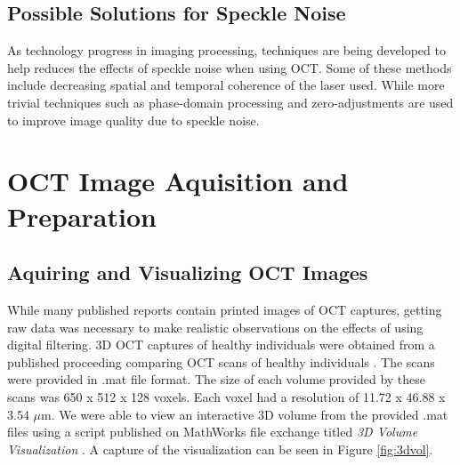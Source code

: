 \documentclass[%
reprint,
showpacs,preprintnumbers,
bibnotes,
amsmath,amssymb,
aps,
pra,
]{revtex4-1}
\begin{document}
	\subsection{\label{sec:level2} Possible Solutions for Speckle Noise}
		As technology progress in imaging processing, techniques are being developed to help reduces the effects of speckle noise when using OCT. Some of these methods include decreasing spatial and temporal coherence of the laser used. While more trivial techniques such as phase-domain processing and zero-adjustments are used to improve image quality due to speckle noise. \cite{Popescu2007}

	\section{\label{sec:level1} OCT Image Aquisition and Preparation}

	\subsection{\label{sec:level2} Aquiring and Visualizing OCT Images}
		While many published reports contain printed images of OCT captures, getting raw data was necessary to make realistic observations on the effects of using digital filtering. 3D OCT captures of healthy individuals were obtained from a published proceeding comparing OCT scans of healthy individuals \cite{tahereh_2014}. The scans were provided in .mat file format. The size of each volume provided by these scans was 650 x 512 x 128 voxels. Each voxel had a resolution of 11.72 x 46.88 x 3.54 $\mu$m. We were able to view an interactive 3D volume from the provided .mat files using a script published on MathWorks file exchange titled \textit{3D Volume Visualization} \cite{stough}. A capture of the visualization can be seen in Figure \ref{fig:3dvol}.
\end{document}
